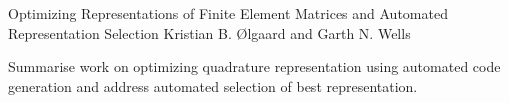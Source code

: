               {Optimizing Representations of Finite Element Matrices and 
               Automated Representation Selection}
              {Kristian B. {\O}lgaard and Garth N. Wells}

\editornote{[oelgaard-2]}

Summarise work on optimizing quadrature representation using automated code
generation and address automated selection of best representation. 
